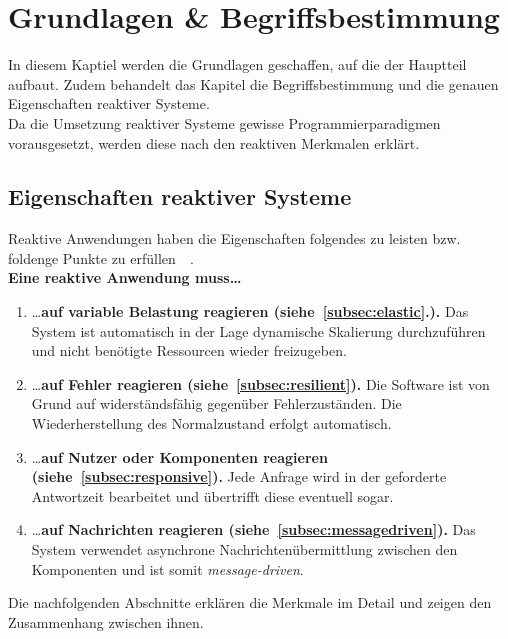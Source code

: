 \chapter{Grundlagen \& Begriffsbestimmung}
In diesem Kaptiel werden die Grundlagen geschaffen, auf die der Hauptteil aufbaut. Zudem behandelt das Kapitel die Begriffsbestimmung und die genauen Eigenschaften reaktiver Systeme.\\
Da die Umsetzung reaktiver Systeme gewisse Programmierparadigmen vorausgesetzt, werden diese nach den reaktiven Merkmalen erklärt.

\section{Eigenschaften reaktiver Systeme}
Reaktive Anwendungen haben die Eigenschaften folgendes zu leisten bzw. foldenge Punkte zu erfüllen~\cite[S.~19ff]{kuhn_reactive_2015}~\cite[S.~6]{vernon_reactive_2016}.\\

\textbf{Eine reaktive Anwendung muss\ldots}
\begin{enumerate}
\item \ldots \textbf{auf variable Belastung reagieren (siehe~\ref{subsec:elastic}.).} Das System ist automatisch in der Lage dynamische Skalierung durchzuführen und nicht benötigte Ressourcen wieder freizugeben.
\item \ldots \textbf{auf Fehler reagieren (siehe~\ref{subsec:resilient}).} Die Software ist von Grund auf widerständsfähig gegenüber Fehlerzuständen. Die Wiederherstellung des Normalzustand erfolgt automatisch.
\item \ldots \textbf{auf Nutzer oder Komponenten reagieren (siehe~\ref{subsec:responsive}).} Jede Anfrage wird in der geforderte Antwortzeit bearbeitet und übertrifft diese eventuell sogar.
\item \ldots \textbf{auf Nachrichten reagieren (siehe~\ref{subsec:messagedriven}).} Das System verwendet asynchrone Nachrichtenübermittlung zwischen den Komponenten und ist somit \textit{message-driven}.
\end{enumerate}

Die nachfolgenden Abschnitte erklären die Merkmale im Detail und zeigen den Zusammenhang zwischen ihnen.

